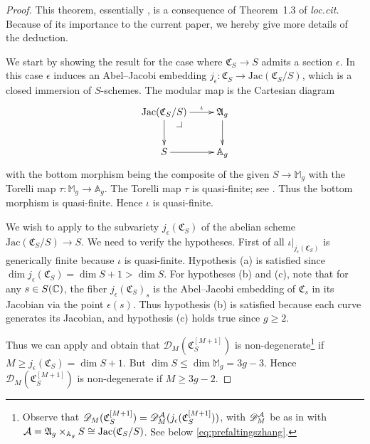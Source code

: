 \begin{proof}
This theorem, essentially \cite[Theorem~1.2']{GaoBettiRank}, is a consequence of Theorem~1.3 of \textit{loc.cit.} Because of its importance to the current paper, we hereby give more details of the deduction.

We start by showing the result for the case where $\mathfrak{C}_S
\rightarrow S$ admits a section $\epsilon$. %
In this case $\epsilon$ induces an Abel--Jacobi embedding $j_{\epsilon} \colon \mathfrak{C}_S \rightarrow \mathrm{Jac}(\mathfrak{C}_S/S)$, which is a closed immersion of $S$-schemes. The modular map is the Cartesian diagram
\[
\xymatrix{
\mathrm{Jac}(\mathfrak{C}_S/S) \ar[r]^-{\iota} \ar[d] \pullbackcorner & \mathfrak{A}_g \ar[d] \\
S \ar[r] & \mathbb{A}_g
}
\]
with the bottom morphism being the composite of the given $S \rightarrow \mathbb{M}_g$ with the Torelli map $\tau \colon \mathbb{M}_g \rightarrow \mathbb{A}_g$. The Torelli map $\tau$ is quasi-finite; see \cite[Lemma 1.11]{OortSteenbrink}. Thus the bottom morphism is quasi-finite. Hence $\iota$ is quasi-finite.

We wish to apply \cite[Theorem~1.3]{GaoBettiRank} to the subvariety $j_{\epsilon}(\mathfrak{C}_S)$ of the abelian scheme $\mathrm{Jac}(\mathfrak{C}_S/S) \rightarrow S$. We need to verify the hypotheses. First of all $\iota|_{j_{\epsilon}(\mathfrak{C}_S)}$ is generically finite because $\iota$ is quasi-finite. Hypothesis (a) is satisfied since $\dim j_{\epsilon}(\mathfrak{C}_S) = \dim S + 1 > \dim S$. For hypotheses (b) and (c), note that for any $s\in S({\mathbb{C}})$, the fiber $j_{\epsilon}(\mathfrak{C}_S)_s$ is the Abel--Jacobi embedding of $\mathfrak{C}_s$ in its Jacobian via the point $\epsilon(s)$. Thus hypothesis (b) is satisfied because each curve generates its Jacobian, and hypothesis (c) holds true since $g \ge 2$.

Thus we can apply \cite[Theorem~1.3.(ii)]{GaoBettiRank} and obtain that $\mathscr{D}_M(\mathfrak{C}_S^{[M+1]})$ is non-degenerate\footnote{Observe that $\mathscr{D}_M(\mathfrak{C}_S^{[M+1]}) = \mathscr{D}_M^{\mathcal{A}}(j_{\epsilon}(\mathfrak{C}_S^{[M+1]}))$, with $\mathscr{D}_M^{\mathcal{A}}$ be as in \cite[Theorem~1.3.(ii)]{GaoBettiRank} with $\mathcal{A} = \mathfrak{A}_g\times_{\mathbb{A}_g}S \cong \mathrm{Jac}(\mathfrak{C}_S/S)$. See below \eqref{eq:prefaltingszhang}.} if $M \ge j_{\epsilon}(\mathfrak{C}_S) = \dim S + 1$. But $\dim S \le \dim \mathbb{M}_g = 3g-3$. Hence  $\mathscr{D}_M(\mathfrak{C}_S^{[M+1]})$ is non-degenerate if $M \ge 3g-2$.


\end{proof}
